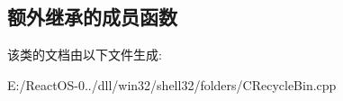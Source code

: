 \subsection*{额外继承的成员函数}


该类的文档由以下文件生成\+:\begin{DoxyCompactItemize}
\item 
E\+:/\+React\+O\+S-\/0../dll/win32/shell32/folders/C\+Recycle\+Bin.\+cpp\end{DoxyCompactItemize}
